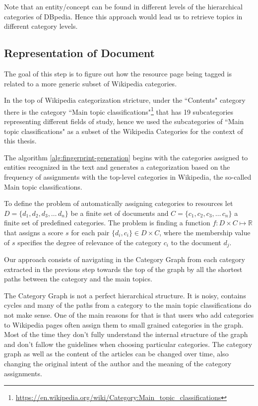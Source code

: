 Note that an entity/concept can be found in different levels of the hierarchical categories of DBpedia. Hence this approach would lead us to retrieve topics in different category levels. 

\subsection{\hspace*{3pt} Representation of Document}
\label{sec:doc-representation}

The goal of this step is to figure out how the resource page being tagged is related to a more generic subset of Wikipedia categories. 

In the top of Wikipedia categorization stricture, under the ``Contents" category there is the category ``Main topic classifications"\footnote{\url{https://en.wikipedia.org/wiki/Category:Main_topic_classifications}} that has 19 subcategories representing different fields of study, hence we used the subcategories of ``Main topic classifications" as a subset of the Wikipedia Categories for the context of this thesis. 

The algorithm \ref{alg:fingerprint-generation} begins with the categories assigned to entities recognized in the text and generates a categorization based on the frequency of assignments with the top-level categories in Wikipedia, the so-called Main topic classifications.

To define the problem of automatically assigning categories to resources let $D = \{d_1,d_2,d_3,\ldots\,d_n\}$ be a finite set of documents and $C = \{c_1,c_2,c_3,\ldots\,c_n\}$ a finite set of predefined categories.
The problem is finding a function $f: D \times C \mapsto \mathbb{R}$ that assigns a score $s$ for each pair 
$\{d_i, c_i\} \in  D \times C $, where the membership value of  $s$ specifies the degree of relevance of the category $c_i$ to the document $d_j$.


Our approach consists of navigating in the Category Graph from each category extracted in the previous step towards the top of the graph by all the shortest paths between the category and the main topics.  

The Category Graph is not a perfect hierarchical structure. It is noisy, contains cycles and many of the paths from a category to the main topic classifications do not make sense. One of the main reasons for that is that users who add categories to Wikipedia pages often assign them to small grained categories in the graph. Most of the time they don't fully understand the internal structure of the graph and don't fallow the guidelines when choosing particular categories. The category graph as well as the content of the articles can be changed over time, also changing the original intent of the author and the meaning of the category assignments.

